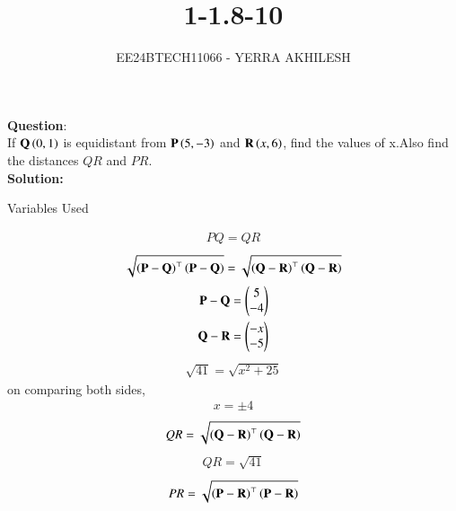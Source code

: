 \documentclass[journal]{IEEEtran}
\begin{document}

\vspace{3cm}

\title{1-1.8-10}
\author{EE24BTECH11066 - YERRA AKHILESH
}
{\let\newpage\relax\maketitle}

\renewcommand{\thefigure}{\theenumi}
\renewcommand{\thetable}{\theenumi}
\setlength{\intextsep}{10pt} %


\renewcommand{\thetable}{\theenumi}
\textbf{Question}:\\
If $\mathbf{Q}\left(0, 1\right)$ is equidistant from $\mathbf{P}\left(5, -3\right)$ and $\mathbf{R}\left(x, 6\right)$, find the values of x.Also find the distances $QR$ and $PR$.
\\
\textbf{Solution: }
\begin{table}[h!]    
  \centering
  
  \caption{Variables Used}
  \label{tab1-1.8-10}
\end{table}
\begin{align}
    PQ = QR
\end{align}  
\begin{align}
    \sqrt{\left(\mathbf{P}-\mathbf{Q}\right)^\top\left(\mathbf{P}-\mathbf{Q}\right)}=\sqrt{\left(\mathbf{Q}-\mathbf{R}\right)^\top\left(\mathbf{Q}-\mathbf{R}\right)}
\end{align}
\begin{align}
    \mathbf{P}-\mathbf{Q}=\begin{pmatrix}5\\-4\end{pmatrix}\\
    \mathbf{Q}-\mathbf{R}=\begin{pmatrix}-x\\-5\end{pmatrix}
\end{align}
\begin{align}    
    \sqrt{41}=\sqrt{x^2+25}
\end{align}
on comparing both sides,
\begin{align}
    x=\pm{4}
\end{align}
\begin{align}
    QR=\sqrt{\left(\mathbf{Q}-\mathbf{R}\right)^\top\left(\mathbf{Q}-\mathbf{R}\right)}
\end{align}
\begin{align}
    QR=\sqrt{41}
\end{align}
\begin{align}
    PR=\sqrt{\left(\mathbf{P}-\mathbf{R}\right)^\top\left(\mathbf{P}-\mathbf{R}\right)}
\end{align}
\end{document}
